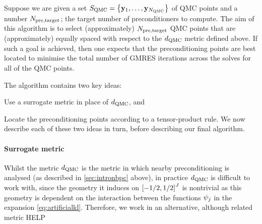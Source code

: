 Suppose we are given a set $\SQMC = \set{\byo,\ldots,\byNQMC}$ of QMC points and a number $N_{\mathrm{pre,target}}$; the target number of preconditioners to compute. The aim of this algorithm is to select (approximately) $N_{\mathrm{pre,target}}$ QMC points that are (approximately) equally spaced with respect to the $d_{\mathrm{QMC}}$ metric defined above. If such a goal is achieved, then one expects that the preconditioning points are best located to minimise the total number of GMRES iterations across the solves for all of the QMC points.

The algorithm contains two key ideas:
\ben
  \item Use a surrogate metric in place of $d_{\mathrm{QMC}}$, and
\item Locate the preconditioning points according to a tensor-product rule.
  \een
  We now describe each of these two ideas in turn, before describing our final algorithm.

\paragraph{Surrogate metric} Whilst the metric $d_{\mathrm{QMC}}$ is the metric in which  nearby preconditioning is analysed (as described in \cref{sec:intronbpc} above), in practice $d_{\mathrm{QMC}}$ is difficult to work with, since the  geometry it induces on $\cube{J}$ is nontrivial as this geometry is dependent on the interaction between the functions $\psi_{j}$ in the expansion \cref{eq:artificialkl}. Therefore, we work in an alternative, although related metric HELP

